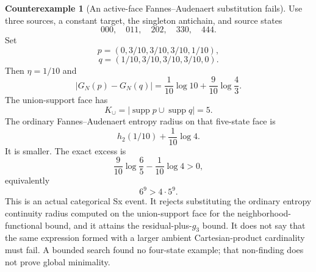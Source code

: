 \documentclass[11pt]{article}
\theoremstyle{definition}
\newtheorem{counterexample}[theorem]{Counterexample}
\begin{document}
\begin{counterexample}[An active-face Fannes--Audenaert substitution fails]
Use three sources, a constant target, the singleton antichain, and source states
\begin{equation}
  000,\quad011,\quad202,\quad330,\quad444.
\end{equation}
Set
\begin{equation}
  p=(0,3/10,3/10,3/10,1/10),
\end{equation}
\begin{equation}
  q=(1/10,3/10,3/10,3/10,0).
\end{equation}
Then \(\eta=1/10\) and
\begin{equation}
  |G_N(p)-G_N(q)|
  =
  \frac1{10}\log10+\frac9{10}\log\frac43.
\end{equation}
The union-support face has
\begin{equation}
  K_\cup
  =
  |\operatorname{supp}p\cup\operatorname{supp}q|
  =5.
\end{equation}
The ordinary Fannes--Audenaert entropy radius on that five-state face is
\begin{equation}
  h_2(1/10)+\frac1{10}\log4.
\end{equation}
It is smaller.  The exact excess is
\begin{equation}
  \frac9{10}\log\frac65-\frac1{10}\log4>0,
\end{equation}
equivalently
\begin{equation}
  6^9>4\cdot5^9.
\end{equation}
This is an actual categorical Sx event.  It rejects substituting the ordinary entropy continuity
radius computed on the union-support face for the neighborhood-functional bound, and it attains
the residual-plus-\(g_3\) bound.  It does not say that the same expression formed with a larger
ambient Cartesian-product cardinality must fail.  A bounded search found no four-state example;
that non-finding does not prove global minimality.
\end{counterexample}
\end{document}
